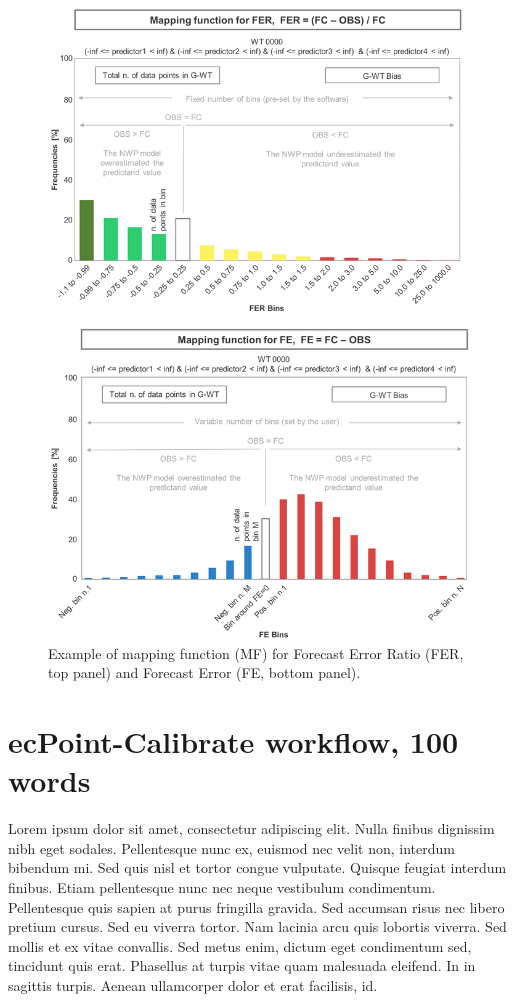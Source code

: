 \documentclass[techmemo]{ecmwfrep}%
\begin{document}
\begin{figure}
\centering
\includegraphics{Figures/Examples_MF.png}
\caption{Example of mapping function (MF) for Forecast Error Ratio (FER, top panel) and Forecast Error (FE, bottom panel).}
\label{Examples_MF}
\end{figure}

\section{ecPoint-Calibrate workflow, 100 words}

Lorem ipsum dolor sit amet, consectetur adipiscing elit. Nulla finibus dignissim nibh eget sodales. Pellentesque nunc ex, euismod nec velit non, interdum bibendum mi. Sed quis nisl et tortor congue vulputate. Quisque feugiat interdum finibus. Etiam pellentesque nunc nec neque vestibulum condimentum. Pellentesque quis sapien at purus fringilla gravida. Sed accumsan risus nec libero pretium cursus. Sed eu viverra tortor. Nam lacinia arcu quis lobortis viverra. Sed mollis et ex vitae convallis. Sed metus enim, dictum eget condimentum sed, tincidunt quis erat. Phasellus at turpis vitae quam malesuada eleifend. In in sagittis turpis. Aenean ullamcorper dolor et erat facilisis, id.
\end{document}
